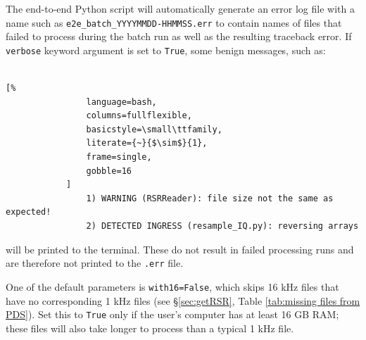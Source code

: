\documentclass[titlepage, 12pt]{article}
\begin{document}
           The end-to-end Python script will automatically generate an error log file with a name such as 
            \texttt{e2e\_batch\_YYYYMMDD-HHMMSS.err}  
            to contain names of files that failed
            to process during the batch run as well as the resulting traceback
            error. If \texttt{verbose} keyword argument is set to
            \texttt{True}, some benign messages, such as:\\
            \\
            \begin{lstlisting}[%
                language=bash,
                columns=fullflexible,
                basicstyle=\small\ttfamily,
                literate={~}{$\sim$}{1},
                frame=single,
                gobble=16
            ]
                1) WARNING (RSRReader): file size not the same as expected!
                2) DETECTED INGRESS (resample_IQ.py): reversing arrays
            \end{lstlisting}
            will be printed to the terminal. These do not result in failed processing runs and are therefore not printed to the \texttt{.err} file.
            \par\hfill\par
            One of the default parameters is
            \texttt{with16=False}, which skips 16 kHz files that have no
            corresponding 1 kHz files (see \S\ref{sec:getRSR}, Table
            \ref{tab:missing files from PDS}). Set this to \texttt{True} only if
            the user's computer has at least 16 GB RAM; these files will also take
            longer to process than a typical 1 kHz file.
            
\end{document}

